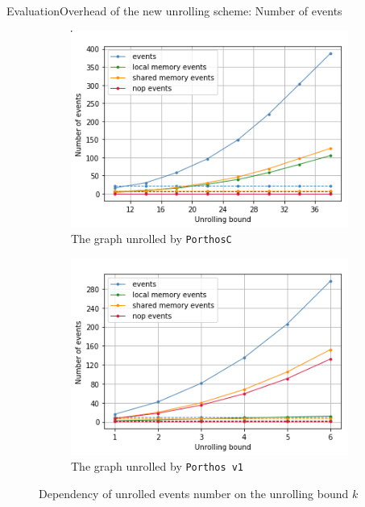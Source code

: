 \documentclass[aspectratio=149]{beamer}
\newcommand{\tool}[1]{\texttt{#1}}
\begin{document}
\begin{frame}{Evaluation}{Overhead of the new unrolling scheme: Number of events}
\begin{figure}[t]
\begin{subfigure}{.47\textwidth}
\includegraphics[width=\textwidth,keepaspectratio]{../img/my/performance/new/new-e.png}
\caption{The graph unrolled by \tool{PorthosC}}
\label{dep:events:new}
\end{subfigure}
\hfill
%
\begin{subfigure}{.47\textwidth}
\includegraphics[width=\textwidth,keepaspectratio]{../img/my/performance/new/old-e.png}
\caption{The graph unrolled by \tool{Porthos\,v1}}
\label{dep:events:old}
\end{subfigure}
%
\caption{Dependency of unrolled events number on the unrolling bound $k$}
\label{dep:events}
\end{figure}
\end{frame}
\end{document}
